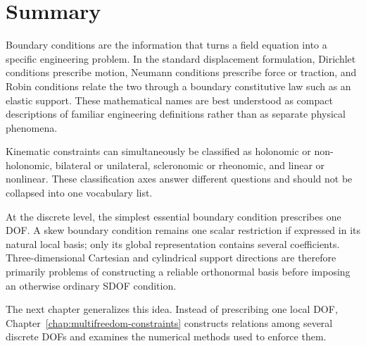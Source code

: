 \section{Summary}

Boundary conditions are the information that turns a field equation into a
specific engineering problem. In the standard displacement formulation,
Dirichlet conditions prescribe motion, Neumann conditions prescribe force or
traction, and Robin conditions relate the two through a boundary constitutive
law such as an elastic support. These mathematical names are best understood as
compact descriptions of familiar engineering definitions rather than as
separate physical phenomena.

Kinematic constraints can simultaneously be classified as holonomic or
non-holonomic, bilateral or unilateral, scleronomic or rheonomic, and linear or
nonlinear. These classification axes answer different questions and should not
be collapsed into one vocabulary list.

At the discrete level, the simplest essential boundary condition prescribes one
DOF. A skew boundary condition remains one scalar restriction if expressed in
its natural local basis; only its global representation contains several
coefficients. Three-dimensional Cartesian and cylindrical support directions
are therefore primarily problems of constructing a reliable orthonormal basis
before imposing an otherwise ordinary SDOF condition.

The next chapter generalizes this idea. Instead of prescribing one local DOF,
Chapter~\ref{chap:multifreedom-constraints} constructs relations among several
discrete DOFs and examines the numerical methods used to enforce them.
